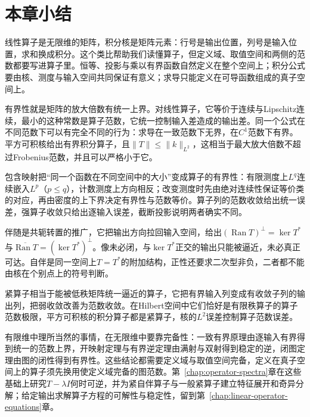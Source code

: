 \section{本章小结}
\label{sec:lop-summary}

线性算子是无限维的矩阵，积分核是矩阵元素：行号是输出位置，列号是输入位置，求和换成积分。这个类比帮助我们读懂算子，但定义域、取值空间和两侧的范数都要写进算子里。恒等、投影与乘以有界函数自然定义在整个空间上；积分公式要由核、测度与输入空间共同保证有意义；求导只能定义在可导函数组成的真子空间上。

有界性就是矩阵的放大倍数有统一上界。对线性算子，它等价于连续与Lipschitz连续，最小的这种常数是算子范数，它统一控制输入差造成的输出差。同一个公式在不同范数下可以有完全不同的行为：求导在一致范数下无界，在$C^1$范数下有界。平方可积核给出有界积分算子，且$\lVert T\rVert\leq\lVert k\rVert_{L^2}$，这相当于最大放大倍数不超过Frobenius范数，并且可以严格小于它。

包含映射把“同一个函数在不同空间中的大小”变成算子的有界性：有限测度上$L^q$连续嵌入$L^p$（$p\leq q$），计数测度上方向相反；改变测度时先由绝对连续性保证等价类的对应，再由密度的上下界决定有界性与范数等价。算子列的范数收敛给出统一误差，强算子收敛只给出逐输入误差，截断投影说明两者确实不同。

伴随是共轭转置的推广，它把输出方向拉回输入空间，给出$(\operatorname{Ran}T)^\perp=\ker T^*$与$\overline{\operatorname{Ran}T}=(\ker T^*)^\perp$。像未必闭，与$\ker T^*$正交的输出只能被逼近，未必真正可达。自伴是同一空间上$T=T^*$的附加结构，正性还要求二次型非负，二者都不能由核在个别点上的符号判断。

紧算子相当于能被低秩矩阵统一逼近的算子，它把有界输入列变成有收敛子列的输出列，把弱收敛改善为范数收敛。在Hilbert空间中它们恰好是有限秩算子的算子范数极限，平方可积核的积分算子都是紧算子，核的$L^2$误差控制算子范数误差。

有限维中理所当然的事情，在无限维中要靠完备性：一致有界原理由逐输入有界得到统一的范数上界，开映射定理与有界逆定理由满射与双射得到稳定的逆，闭图定理由图的闭性得到有界性。这些结论都需要定义域与取值空间完备，定义在真子空间上的算子须先换用使定义域完备的图范数。第~\ref{chap:operator-spectra}章在这些基础上研究$T-\lambda I$何时可逆，并为紧自伴算子与一般紧算子建立特征展开和奇异分解；给定输出求解算子方程的可解性与稳定性，留到第~\ref{chap:linear-operator-equations}章。
